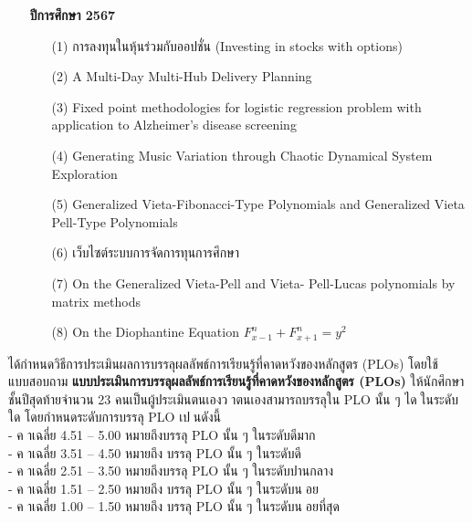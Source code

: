 \begin{enumerate}
\item[]\textbf{ปีการศึกษา 2567}
\begin{itemize}
	\item[(1)] การลงทุนในหุ้นร่วมกับออปชั่น (Investing in stocks with options)
	
	\item[(2)] A Multi-Day Multi-Hub Delivery Planning
	
	\item[(3)] Fixed point methodologies for logistic regression problem with application to Alzheimer’s disease screening     
	
	\item[(4)] Generating Music Variation through Chaotic Dynamical System Exploration
	
	\item[(5)] Generalized Vieta-Fibonacci-Type Polynomials and Generalized Vieta Pell-Type Polynomials
	
	\item[(6)] เว็บไซต์ระบบการจัดการทุนการศึกษา
	
	
	\item[(7)] On the Generalized Vieta-Pell and Vieta- Pell-Lucas polynomials by matrix methods  
	
	
	\item[(8)] On the Diophantine Equation $F^n_{x-1} + F^n_{x+1} = y^2$
	
\end{itemize}
\end{enumerate}


\begin{doclist}
\end{doclist}


\printprogram{} ได้กำหนดวิธีการประเมินผลการบรรลุผลลัพธ์การเรียนรู้ที่คาดหวังของหลักสูตร  (PLOs) โดยใช้แบบสอบถาม {\bf แบบประเมินการบรรลุผลลัพธ์การเรียนรู้ที่คาดหวังของหลักสูตร (PLOs)} ให้นักศึกษาชั้นปีสุดท้ายจำนวน 23 คนเป็นผู้ประเมินตนเองวาตนเองสามารถบรรลุใน PLO นั้น ๆ ไดในระดับใด โดยกําหนดระดับการบรรลุ PLO เปนดังนี้\\
- คาเฉลี่ย 4.51 – 5.00 หมายถึงบรรลุ PLO นั้น ๆ ในระดับดีมาก\\
- คาเฉลี่ย 3.51 – 4.50 หมายถึง บรรลุ PLO นั้น ๆ ในระดับดี\\
- คาเฉลี่ย 2.51 – 3.50 หมายถึงบรรลุ PLO นั้น ๆ ในระดับปานกลาง\\
- คาเฉลี่ย 1.51 – 2.50 หมายถึง บรรลุ PLO นั้น ๆ ในระดับนอย\\
- คาเฉลี่ย 1.00 – 1.50 หมายถึง บรรลุ PLO นั้น ๆ ในระดับนอยที่สุด

